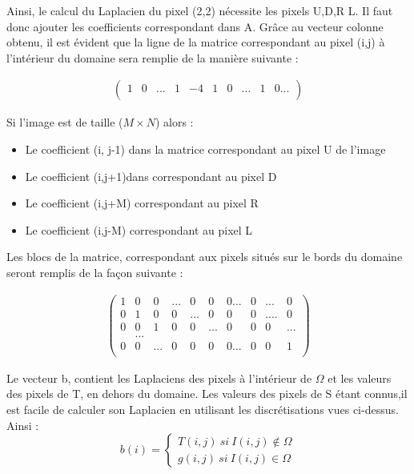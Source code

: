 Ainsi, le calcul du Laplacien du pixel (2,2) nécessite les pixels U,D,R L. Il faut donc ajouter les coefficients correspondant dans A. Grâce au vecteur colonne obtenu, il est évident que la ligne de la matrice correspondant au pixel (i,j) à l'intérieur du domaine sera remplie de la manière  suivante : 
\begin{center}
\begin{equation}
\left.
\begin{aligned}
\begin{pmatrix}
	1 & 0 & ... &  1 &-4 & 1 & 0 & ... & 1 & 0... \\
\end{pmatrix}
\end{aligned}
\right.
\end{equation}
\end{center}
Si l'image est de taille ($M\times N$) alors : 
\begin{itemize}
\item Le coefficient (i, j-1) dans la matrice correspondant au pixel U de l'image
\item Le coefficient (i,j+1)dans  correspondant au pixel D
\item Le coefficient (i,j+M) correspondant au pixel R
\item Le coefficient (i,j-M) correspondant au pixel L
\end{itemize}

Les blocs de la matrice, correspondant aux pixels situés sur le bords du domaine seront remplis de la façon suivante : 
\begin{center}
\begin{equation}
\left.
\begin{aligned}
\begin{pmatrix}
	1 & 0& 0 & ...& 0 & 0 & 0...&0& ... & 0\\
	0 & 1 & 0 & 0 & ... & 0 &0 &0&....&0\\
	0 & 0 & 1 & 0 & 0&... &0 &0 &0&...\\
	&...\\
	0 & 0 &... &0 &0 &0 &0...& 0& 0 & 1\\
\end{pmatrix}
\end{aligned}
\right.
\end{equation}
\end{center}
Le vecteur b, contient les Laplaciens des pixels à l'intérieur de $\Omega$ et les valeurs des pixels de T, en dehors du domaine. 
Les valeurs des pixels de S étant connus,il est facile de calculer son Laplacien en utilisant les discrétisations vues ci-dessus. Ainsi : 
\begin{equation*}
b(i) = 
\left\{
\begin{aligned}
T(i,j) \ si \ I (i,j) \notin \Omega\\
g(i,j) \ si \ I( i,j) \in \Omega
\end{aligned}
\right.
\end{equation*}

